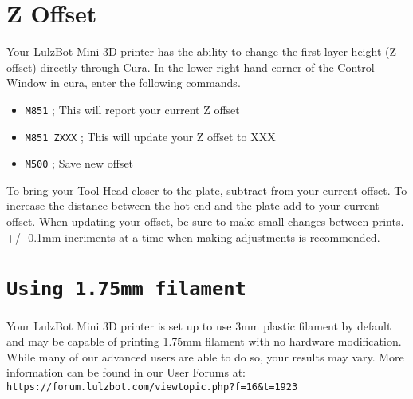 
\section{Z Offset}
\label{sssec:Z Offset}
Your LulzBot Mini 3D printer has the ability to change the first layer height (Z offset) directly through Cura. In the lower right hand corner of the Control Window in cura, enter the following commands.
\begin{itemize}
\item \texttt{M851}                    \textcolor{green2}{; This will report your current Z offset}
\item \texttt{M851 ZXXX}                    \textcolor{green2}{; This will update your Z offset to XXX}
\item \texttt{M500}                    \textcolor{green2}{; Save new offset}
\end{itemize}

To bring your Tool Head closer to the plate, subtract from your current offset. To increase the distance between the hot end and the plate add to your current offset. When updating your offset, be sure to make small changes between prints. +/- 0.1mm incriments at a time when making adjustments is recommended. 

\section{\texttt{Using 1.75mm filament}}

Your LulzBot Mini 3D printer is set up to use 3mm plastic filament by default and may be capable of printing 1.75mm filament with no hardware modification. While many of our advanced users are able to do so, your results may vary.  More information can be found in our User Forums at: \texttt{https://forum.lulzbot.com/viewtopic.php?f=16\&t=1923} 
